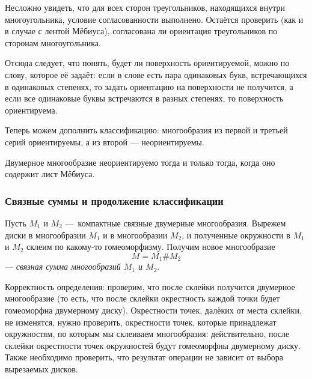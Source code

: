 Несложно увидеть, что для всех сторон треугольников, находящихся внутри многоугольника, условие согласованности выполнено. Остаётся проверить (как и в случае с лентой Мёбиуса), согласована ли ориентация треугольников по сторонам многоугольника.

Отсюда следует, что понять, будет ли поверхность ориентируемой, можно по слову, которое её задаёт: если в слове есть пара одинаковых букв, встречающихся в одинаковых степенях, то задать ориентацию на поверхности не получится, а если все одинаковые буквы встречаются в разных степенях, то поверхность ориентируема.

Теперь можем дополнить классификацию: многообразия из первой и третьей серий ориентируемы, а из второй — неориентируемы.

\begin{statement}
    Двумерное многообразие неориентируемо тогда и только тогда, когда оно содержит лист Мёбиуса.
\end{statement} 


\subsubsection{Связные суммы и продолжение классификации}
\begin{definition}
    Пусть $M_1$ и $M_2$ — компактные связные двумерные многообразия. Вырежем диски в многообразии $M_1$ и в многообразии $M_2$, и полученные окружности в $M_1$ и $M_2$ склеим по какому-то гомеоморфизму. Получим новое многообразие $$M = M_1 \# M_2$$ — \textit{связная сумма многообразий $M_1$ и $M_2$}.
\end{definition} 

Корректность определения: проверим, что после склейки получится двумерное многообразие (то есть, что после склейки окрестность каждой точки будет гомеоморфна двумерному диску). Окрестности точек, далёких от места склейки, не изменятся, нужно проверить, окрестности точек, которые принадлежат окружностям, по которым мы склеиваем многообразия: действительно, после склейки окрестности точек окружностей будут гомеоморфны двумерному диску. Также необходимо проверить, что результат операции не зависит от выбора вырезаемых дисков.


